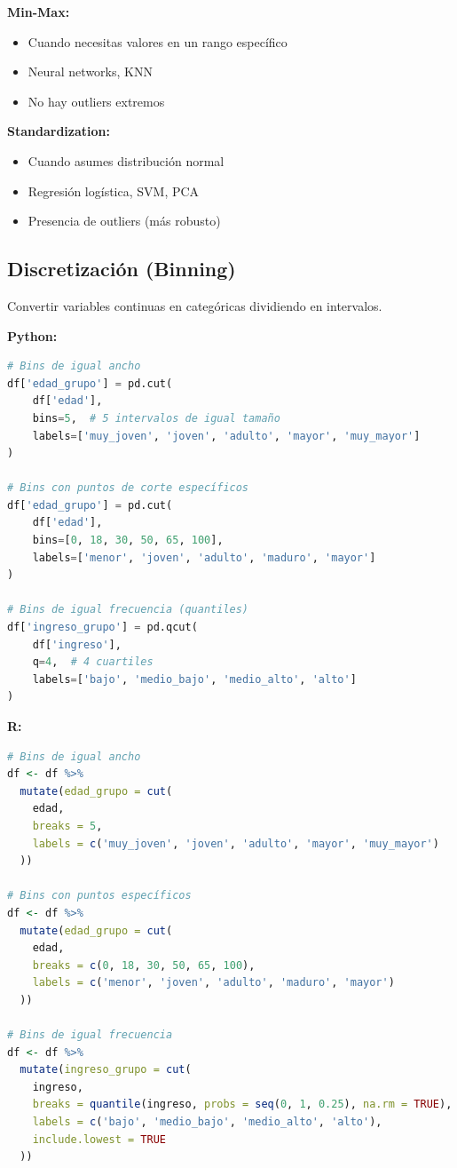 \documentclass[a4paper,11pt]{article}
\begin{document}
\begin{tcolorbox}[colback=ejemplocolor!20, colframe=unidadcolor, title=¿Cuándo usar cada uno?]
\textbf{Min-Max:}
\begin{itemize}
    \item Cuando necesitas valores en un rango específico
    \item Neural networks, KNN
    \item No hay outliers extremos
\end{itemize}

\textbf{Standardization:}
\begin{itemize}
    \item Cuando asumes distribución normal
    \item Regresión logística, SVM, PCA
    \item Presencia de outliers (más robusto)
\end{itemize}
\end{tcolorbox}

\subsection{Discretización (Binning)}

Convertir variables continuas en categóricas dividiendo en intervalos.

\textbf{Python:}
\begin{lstlisting}[language=Python]
# Bins de igual ancho
df['edad_grupo'] = pd.cut(
    df['edad'],
    bins=5,  # 5 intervalos de igual tamaño
    labels=['muy_joven', 'joven', 'adulto', 'mayor', 'muy_mayor']
)

# Bins con puntos de corte específicos
df['edad_grupo'] = pd.cut(
    df['edad'],
    bins=[0, 18, 30, 50, 65, 100],
    labels=['menor', 'joven', 'adulto', 'maduro', 'mayor']
)

# Bins de igual frecuencia (quantiles)
df['ingreso_grupo'] = pd.qcut(
    df['ingreso'],
    q=4,  # 4 cuartiles
    labels=['bajo', 'medio_bajo', 'medio_alto', 'alto']
)
\end{lstlisting}

\textbf{R:}
\begin{lstlisting}[language=R]
# Bins de igual ancho
df <- df %>%
  mutate(edad_grupo = cut(
    edad,
    breaks = 5,
    labels = c('muy_joven', 'joven', 'adulto', 'mayor', 'muy_mayor')
  ))

# Bins con puntos específicos
df <- df %>%
  mutate(edad_grupo = cut(
    edad,
    breaks = c(0, 18, 30, 50, 65, 100),
    labels = c('menor', 'joven', 'adulto', 'maduro', 'mayor')
  ))

# Bins de igual frecuencia
df <- df %>%
  mutate(ingreso_grupo = cut(
    ingreso,
    breaks = quantile(ingreso, probs = seq(0, 1, 0.25), na.rm = TRUE),
    labels = c('bajo', 'medio_bajo', 'medio_alto', 'alto'),
    include.lowest = TRUE
  ))
\end{lstlisting}
\end{document}
